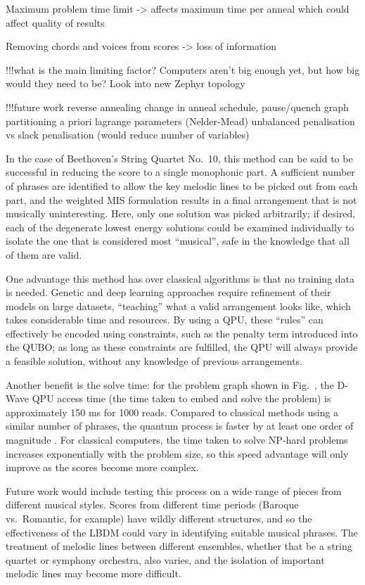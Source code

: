 \documentclass[12pt]{article}
\theoremstyle{definition}
\begin{document}
Maximum problem time limit -> affects maximum time per anneal which could affect quality of results

Removing chords and voices from scores -> loss of information

!!!what is the main limiting factor?
Computers aren't big enough yet, but how big would they need to be? Look into new Zephyr topology

!!!future work
reverse annealing
change in anneal schedule, pause/quench
graph partitioning
a priori lagrange parameters (Nelder-Mead)
unbalanced penalisation vs slack penalisation (would reduce number of variables)


In the case of Beethoven's String Quartet No.\ 10, this method can be said to be successful in reducing the score to a single monophonic part. A sufficient number of phrases are identified to allow the key melodic lines to be picked out from each part, and the weighted MIS formulation results in a final arrangement that is not musically uninteresting. Here, only one solution was picked arbitrarily; if desired, each of the degenerate lowest energy solutions could be examined individually to isolate the one that is considered most ``musical'', safe in the knowledge that all of them are valid.

One advantage this method has over classical algorithms is that no training data is needed. Genetic and deep learning approaches require refinement of their models on large datasets, ``teaching'' what a valid arrangement looks like, which takes considerable time and resources. By using a QPU, these ``rules'' can effectively be encoded using constraints, such as the penalty term introduced into the QUBO; as long as these constraints are fulfilled, the QPU will always provide a feasible solution, without any knowledge of previous arrangements.

Another benefit is the solve time: for the problem graph shown in Fig.\  , the D-Wave QPU access time (the time taken to embed and solve the problem) is approximately 150 ms for 1000 reads. Compared to classical methods using a similar number of phrases, the quantum process is faster by at least one order of magnitude . For classical computers, the time taken to solve NP-hard problems increases exponentially with the problem size, so this speed advantage will only improve as the scores become more complex.

Future work would include testing this process on a wide range of pieces from different musical styles. Scores from different time periods (Baroque vs.\ Romantic, for example) have wildly different structures, and so the effectiveness of the LBDM could vary in identifying suitable musical phrases. The treatment of melodic lines between different ensembles, whether that be a string quartet or symphony orchestra, also varies, and the isolation of important melodic lines may become more difficult.
\end{document}
